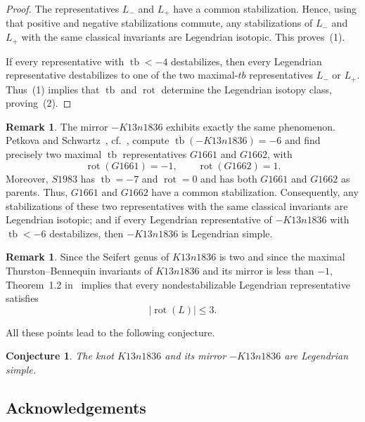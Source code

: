 \documentclass{amsart} %
\DeclareMathOperator{\rot}{rot}
\DeclareMathOperator{\tb}{tb}
\theoremstyle{thm}
\newtheorem{conjecture}[Theorem]{Conjecture}
\theoremstyle{definition}
\newtheorem{rem}[Theorem]{Remark}
\numberwithin{equation}{section}
\begin{document}
\begin{proof}
The representatives \(L_-\) and \(L_+\) have a common stabilization. Hence,
using that positive and negative stabilizations commute, any stabilizations of
\(L_-\) and \(L_+\) with the same classical invariants are Legendrian isotopic.
This proves~(1).

If every representative with \(\tb<-4\) destabilizes, then every Legendrian
representative destabilizes to one of the two maximal-\(tb\) representatives
\(L_-\) or \(L_+\). Thus~(1) implies that \(\tb\) and \(\rot\) determine the
Legendrian isotopy class, proving~(2).
\end{proof}

\begin{rem}
The mirror $-K13n1836$ exhibits exactly the same phenomenon. Petko\-va and Schwartz~\cite{PetkovaSchwartz}, cf.\ \cite{LSULegendrianAtlas}, compute $\overline{\tb}(-K13n1836)=-6$
and find precisely two maximal $\tb$ representatives $G1661$ and $G1662$, with
\begin{equation*}
    \rot(G1661)=-1,
\qquad
\rot(G1662)=1.
\end{equation*}
Moreover, $S1983$ has $\tb=-7$ and $\rot=0$ and has both $G1661$ and $G1662$ as parents. Thus, $G1661$ and $G1662$ have a common stabilization. Consequently, any stabilizations of these two representatives with the same classical invariants are Legendrian isotopic; and if every Legendrian representative of $-K13n1836$ with $\tb<-6$ destabilizes, then $-K13n1836$ is Legendrian simple.
\end{rem}

\begin{rem}
Since the Seifert genus of $K13n1836$ is two and since the maximal Thurston--Bennequin invariants of $K13n1836$ and its mirror is less than $-1$, Theorem~1.2 in~\cite{Etnyre_neighborhood} implies that every nondestabilizable Legendrian representative satisfies
$$
|\rot(L)|\le 3.
$$
\end{rem}

All these points lead to the following conjecture.

\begin{conjecture}
The knot \(K13n1836\) and its mirror \(-K13n1836\) are Legendrian simple.
\end{conjecture}

\subsection*{Acknowledgements}
\end{document}
